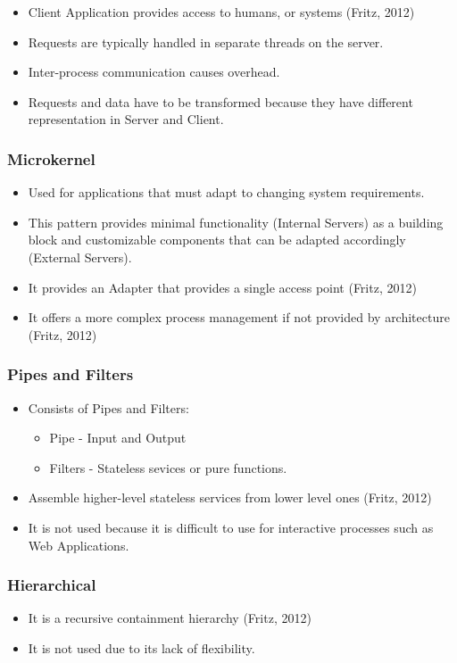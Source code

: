 \documentclass{article}
\begin{document}
\begin{itemize}

\item Client Application provides access to humans, or systems (Fritz, 2012)
\item Requests are typically handled in separate threads on the server.
\item Inter-process communication causes overhead.
\item Requests and data have to be transformed because they have different representation in Server and Client.
\end{itemize}

\subsubsection{Microkernel}
\begin{itemize}
\item Used for applications that must adapt to changing system requirements.
\item This pattern provides minimal functionality (Internal Servers) as a building block and customizable components that can be adapted accordingly (External Servers).
\item It provides an Adapter that provides a single access point (Fritz, 2012)
\item It offers a more complex process management if not provided by architecture (Fritz, 2012)
\end{itemize}

\subsubsection{Pipes and Filters}
\begin{itemize}
\item Consists of Pipes and Filters:
\begin{itemize}
\item Pipe - Input and Output
\item Filters - Stateless sevices or pure functions.
\end{itemize}
\item Assemble higher-level stateless services from lower level ones (Fritz, 2012)
\item It is not used because it is difficult to use for interactive processes such as Web Applications.

\end{itemize}

\subsubsection{Hierarchical}
\begin{itemize}
\item It is a recursive containment hierarchy (Fritz, 2012)
\item It is not used due to its lack of flexibility.
\end{itemize}
\end{document}
